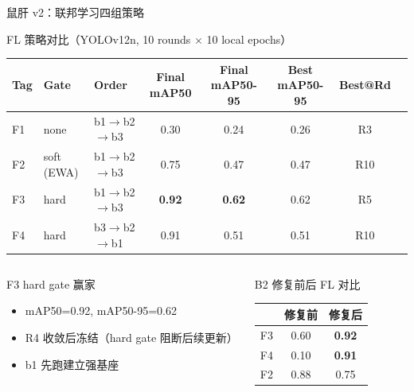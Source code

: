 \documentclass[aspectratio=169, 10pt]{beamer}
\begin{document}
\begin{frame}{鼠肝 v2：联邦学习四组策略}
  \begin{block}{FL 策略对比（YOLOv12n, 10 rounds $\times$ 10 local epochs）}
    \begin{tabular}{lllccccr}
      \toprule
      \textbf{Tag} & \textbf{Gate} & \textbf{Order} & \textbf{Final mAP50} & \textbf{Final mAP50-95} & \textbf{Best mAP50-95} & \textbf{Best@Rd} \\
      \midrule
      F1 & none & b1$\to$b2$\to$b3 & 0.30 & 0.24 & 0.26 & R3 \\
      F2 & soft (EWA) & b1$\to$b2$\to$b3 & 0.75 & 0.47 & 0.47 & R10 \\
      F3 & hard & b1$\to$b2$\to$b3 & \textbf{0.92} & \textbf{0.62} & 0.62 & R5 \\
      F4 & hard & b3$\to$b2$\to$b1 & 0.91 & 0.51 & 0.51 & R10 \\
      \bottomrule
    \end{tabular}
  \end{block}
  \vspace{0em}
  \begin{columns}[T]
    \begin{alertblock}{F3 hard gate 赢家}
      \begin{itemize}
        \item mAP50=0.92, mAP50-95=0.62
        \item R4 收敛后冻结（hard gate 阻断后续更新）
        \item b1 先跑建立强基座
      \end{itemize}
    \end{alertblock}
    \begin{block}{B2 修复前后 FL 对比}
      \begin{tabular}{lcc}
        \toprule
        & 修复前 & 修复后 \\
        \midrule
        F3 & 0.60 & \textbf{0.92} \\
        F4 & 0.10 & \textbf{0.91} \\
        F2 & 0.88 & 0.75 \\
        \bottomrule
      \end{tabular}
    \end{block}
  \end{columns}
\end{frame}
\end{document}
